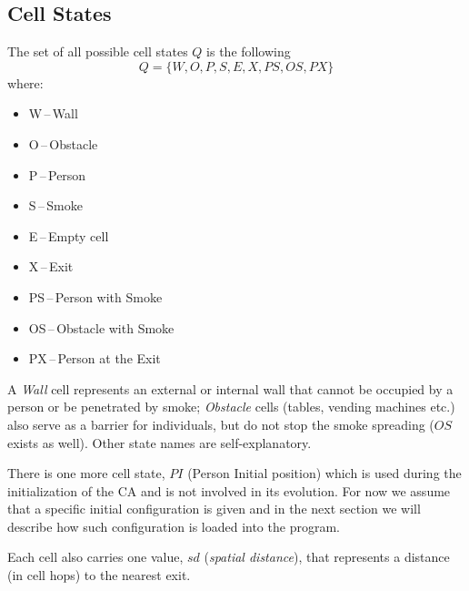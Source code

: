 \subsection{Cell States}
The set of all possible cell states $Q$ is the following
$$Q = \{W,O,P,S,E,X,PS,OS,PX\}$$ where:
\begin{itemize}
    \item W\,--\,Wall
    \item O\,--\,Obstacle
    \item P\,--\,Person
    \item S\,--\,Smoke
    \item E\,--\,Empty cell
    \item X\,--\,Exit
    \item PS\,--\,Person with Smoke
    \item OS\,--\,Obstacle with Smoke
    \item PX\,--\,Person at the Exit
\end{itemize}

A \emph{Wall} cell represents an external or internal wall that cannot be
occupied by a person or be penetrated by smoke; \emph{Obstacle} cells (tables,
vending machines etc.) also serve as a barrier for individuals, but do not stop
the smoke spreading ($OS$ exists as well).
Other state names are self-explanatory.

There is one more cell state, $PI$ (Person Initial position) which is used
during the initialization of the CA and is not involved in its evolution.
For now we assume that a specific initial configuration is given and in the next 
section we will describe how such configuration is loaded into the program.

Each cell also carries one value, $sd$ (\emph{spatial distance}), that
represents a distance (in cell hops) to the nearest exit.

